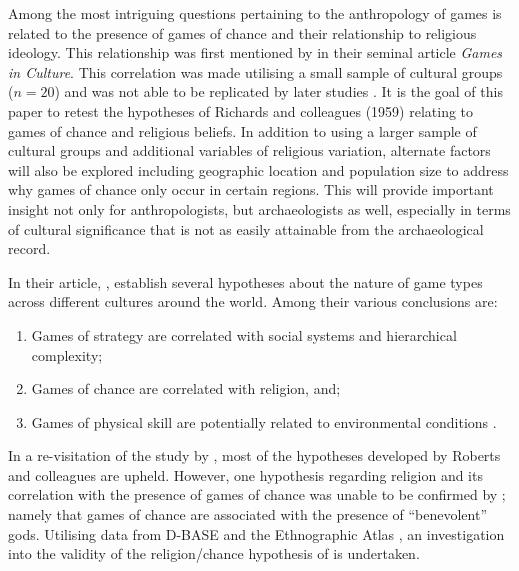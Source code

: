 \documentclass[%
	]{ijsra}
\begin{document}
Among the most intriguing questions pertaining to the anthropology of games is related to the presence of games of chance and their relationship to religious ideology. This relationship was first mentioned by \textcite{roberts1959} in their seminal article \textit{Games in Culture}. This correlation was made utilising a small sample of cultural groups ($n = 20$) and was not able to be replicated by later studies \parencite[e.g.][]{chick1998}. It is the goal of this paper to retest the hypotheses of Richards and colleagues (1959) relating to games of chance and religious beliefs. In addition to using a larger sample of cultural groups and additional variables of religious variation, alternate factors will also be explored including geographic location and population size to address why games of chance only occur in certain regions. This will provide important insight not only for anthropologists, but archaeologists as well, especially in terms of cultural significance that is not as easily attainable from the archaeological record.


In their article, \emph{}, \citeauthor{roberts1959}  establish several hypotheses about the nature of game types across different cultures around the world. Among their various conclusions are:

\begin{enumerate}
\item Games of strategy are correlated with social systems and hierarchical complexity;
\item Games of chance are correlated with religion, and;
\item Games of physical skill are potentially related to environmental conditions \parencite[604]{roberts1959}.
\end{enumerate}

In a re-visitation of the study by \textcite{chick1998}, most of the hypotheses developed by Roberts and colleagues are upheld. However, one hypothesis regarding religion and its correlation with the presence of games of chance was unable to be confirmed by \textcite[192]{chick1998}; namely that games of chance are associated with the presence of ``benevolent” gods. 
Utilising data from D-BASE and the Ethnographic Atlas \parencites{murdock1962}{barry1980}{gray1999}{korotayev2004}{bondarenko2005}, an investigation into the validity of the religion/chance hypothesis of \textcite{roberts1959} is undertaken.
\end{document}
